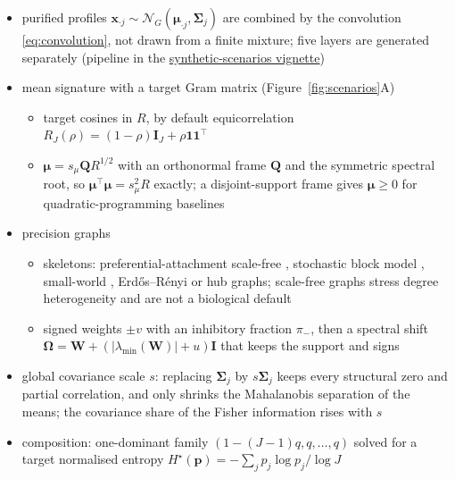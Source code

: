 \documentclass[pdflatex, sn-nature]{sn-jnl}
\theoremstyle{thmstyleone}%
\theoremstyle{thmstyletwo}%
\theoremstyle{thmstylethree}%
\newcommand{\vignette}[2]{\href{https://bastienchassagnol.github.io/DeCovarT/articles/#1}{#2}}
\begin{document}
\begin{itemize}
  \item purified profiles \(\boldsymbol{x}_{\cdot j}\sim\mathcal{N}_{G}(\boldsymbol{\mu}_{\cdot j},\boldsymbol{\Sigma}_{j})\)
        are combined by the convolution \eqref{eq:convolution}, not drawn from a finite mixture;
        five layers are generated separately (pipeline in the
        \vignette{04-1-synthetic-scenarios.html}{synthetic-scenarios vignette})
  \item mean signature with a target Gram matrix (Figure~\ref{fig:scenarios}A)
  \begin{itemize}
    \item target cosines in \(R\), by default equicorrelation \(R_{J}(\rho)=(1-\rho)\mathbf{I}_{J}+\rho\mathbf{1}\mathbf{1}^{\top}\)
    \item \(\boldsymbol{\mu}=s_{\mu}\mathbf{Q}R^{1/2}\) with an orthonormal frame \(\mathbf{Q}\) and the symmetric
          spectral root, so \(\boldsymbol{\mu}^{\top}\boldsymbol{\mu}=s_{\mu}^{2}R\) exactly; a disjoint-support frame
          gives \(\boldsymbol{\mu}\ge 0\) for quadratic-programming baselines
  \end{itemize}
  \item precision graphs
  \begin{itemize}
    \item skeletons: preferential-attachment scale-free \cite{barabasiEmergenceScalingRandom1999},
          stochastic block model \cite{hollandStochasticBlockmodelsFirst1983}, small-world
          \cite{wattsCollectiveDynamicsSmallworld1998}, Erd\H{o}s--R\'enyi or hub graphs; scale-free graphs
          stress degree heterogeneity and are not a biological default \cite{broidoScalefreeNetworksAre2019}
    \item signed weights \(\pm v\) with an inhibitory fraction \(\pi_{-}\), then a spectral shift
          \(\boldsymbol{\Omega}=\boldsymbol{W}+(|\lambda_{\min}(\boldsymbol{W})|+u)\mathbf{I}\) that keeps the support and signs
  \end{itemize}
  \item global covariance scale \(s\): replacing \(\boldsymbol{\Sigma}_{j}\) by \(s\boldsymbol{\Sigma}_{j}\) keeps every
        structural zero and partial correlation, and only shrinks the Mahalanobis separation of the means;
        the covariance share of the Fisher information rises with \(s\)
  \item composition: one-dominant family \((1-(J-1)q,q,\ldots,q)\) solved for a target normalised entropy
        \(H^{\star}(\boldsymbol{p})=-\sum_{j}p_{j}\log p_{j}/\log J\)

\end{itemize}
\end{document}
